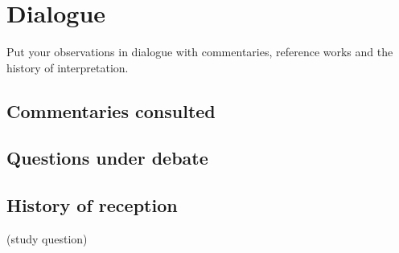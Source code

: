 \chapter{Dialogue}\label{cap:dialogo}

\begin{objetivo}
Put your observations in dialogue with commentaries, reference works and the history of interpretation.
\end{objetivo}

\section{Commentaries consulted}

\section{Questions under debate}

\section{History of reception}

\begin{pergunta}
(study question)
\end{pergunta}
